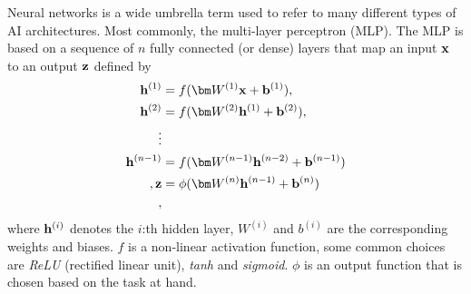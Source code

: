 Neural networks is a wide umbrella term used to refer to many different types of AI architectures. 
Most commonly, the multi-layer perceptron (MLP). 
The MLP is based on a sequence of $n$ fully connected (or dense) layers that map an input $\mathbf{x}$ to an output $\mathbf{z}$ defined by
\begin{align}
\vect h^{(1)} &= f(\mat W^{(1)} \vect x + \vect b^{(1)}), \\
\vect h^{(2)} &= f(\mat W^{(2)} \vect h^{(1)} + \vect b^{(2)}), \\
\vdots \\
\vect h^{(n-1)} &= f(\mat W^{(n-1)} \vect h^{(n-2)} + \vect b^{(n-1)})\\ ,
\vect z &= \phi(\mat W^{(n)} \vect h^{(n-1)} + \vect b^{(n)}) \\,
\end{align}
where $\mathbf{h}^{(i)}$ denotes the $i$:th hidden layer, $W^{(i)}$ and $b^{(i)}$ are the corresponding weights and biases. 
$f$ is a non-linear activation function, some common choices are \textit{ReLU} (rectified linear unit), \textit{tanh} and \textit{sigmoid}.
$\phi$ is an output function that is chosen based on the task at hand. 